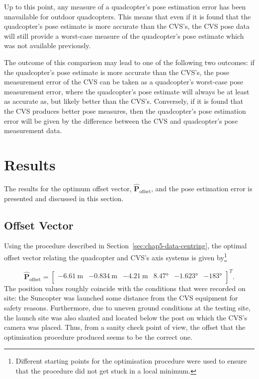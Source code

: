 Up to this point, any measure of a quadcopter's pose estimation error has been unavailable for outdoor quadcopters. This means that even if it is found that the quadcopter's pose estimate is more accurate than the CVS's, the CVS pose data will still provide a worst-case measure of the quadcopter's pose estimate which was not available previously. 

The outcome of this comparison may lead to one of the following two outcomes: if the quadcopter's pose estimate is more accurate than the CVS's, the pose measurement error of the CVS can be taken as a quadcopter's worst-case pose measurement error, where the quadcopter's pose estimate will always be at least as accurate as, but likely better than the CVS's. Conversely, if it is found that the CVS produces better pose measures, then the quadcopter's pose estimation error will be given by the difference between the CVS and quadcopter's pose measurement data. 

\section{Results}

The results for the optimum offset vector, $\hat{\bm{P}}_{\mathrm{offset}}$, and the pose estimation error is presented and discussed in this section. 

\subsection{Offset Vector}

Using the procedure described in Section~\ref{sec:chap5-data-centring}, the optimal offset vector relating the quadcopter and CVS's axis systems is given by\footnote{Different starting points for the optimisation procedure were used to ensure that the procedure did not get stuck in a local minimum.} 

\begin{equation}
  \label{eq:chap5-offset-result}
  \hat{\bm{P}}_{\mathrm{offset}} = 
  \begin{bmatrix}
    \SI{-6.61}{\m} & \SI{-0.834}{\m} & \SI{-4.21}{\m} & \ang{8.47} & \ang{-1.623} & \ang{-183} \\
  \end{bmatrix}^T.
\end{equation}
The position values roughly coincide with the conditions that were recorded on site: the Suncopter was launched some distance from the CVS equipment for safety reasons. Furthermore, due to uneven ground conditions at the testing site, the launch site was also slanted and located below the post on which the CVS's camera was placed. Thus, from a sanity check point of view, the offset that the optimisation procedure produced seems to be the correct one. 

